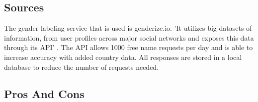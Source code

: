 \documentclass{article}
\begin{document}
\subsection{Sources}
The gender labeling service that is used is genderize.io. 'It utilizes big datasets of information, from user profiles across major social networks and exposes this data through its API' \cite{WEBSITE:GENDER1}. The API allows 1000 free name requests per day and is able to increase accuracy with added country data. All responses are stored in a local database to reduce the number of requests needed.

\subsection{Pros And Cons}
\end{document}
